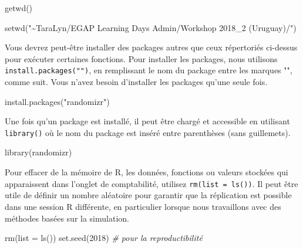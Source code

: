 \documentclass[
  12pt,
]{book}
\newenvironment{Shaded}{\begin{snugshade}}{\end{snugshade}}
\newcommand{\AttributeTok}[1]{\textcolor[rgb]{0.77,0.63,0.00}{#1}}
\newcommand{\CommentTok}[1]{\textcolor[rgb]{0.56,0.35,0.01}{\textit{#1}}}
\newcommand{\DecValTok}[1]{\textcolor[rgb]{0.00,0.00,0.81}{#1}}
\newcommand{\FunctionTok}[1]{\textcolor[rgb]{0.00,0.00,0.00}{#1}}
\newcommand{\NormalTok}[1]{#1}
\newcommand{\StringTok}[1]{\textcolor[rgb]{0.31,0.60,0.02}{#1}}
\begin{document}
\begin{Shaded}
\begin{Highlighting}[]
\FunctionTok{getwd}\NormalTok{()}
\end{Highlighting}
\end{Shaded}

\begin{Shaded}
\begin{Highlighting}[]
\FunctionTok{setwd}\NormalTok{(}\StringTok{"\textasciitilde{}TaraLyn/EGAP Learning Days Admin/Workshop 2018\_2 (Uruguay)/"}\NormalTok{)}
\end{Highlighting}
\end{Shaded}

Vous devrez peut-être installer des packages autres que ceux répertoriés ci-dessus pour exécuter certaines fonctions. Pour installer les packages, nous utilisons \texttt{install.packages("")}, en remplissant le nom du package entre les marques "", comme suit. Vous n'avez besoin d'installer les packages qu'une seule fois.

\begin{Shaded}
\begin{Highlighting}[]
\FunctionTok{install.packages}\NormalTok{(}\StringTok{"randomizr"}\NormalTok{)}
\end{Highlighting}
\end{Shaded}

Une fois qu'un package est installé, il peut être chargé et accessible en utilisant \texttt{library()} où le nom du package est inséré entre parenthèses (sans guillemets).

\begin{Shaded}
\begin{Highlighting}[]
\FunctionTok{library}\NormalTok{(randomizr)}
\end{Highlighting}
\end{Shaded}

Pour effacer de la mémoire de R, les données, fonctions ou valeurs stockées qui apparaissent dans l'onglet de comptabilité, utilisez \texttt{rm(list\ =\ ls())}. Il peut être utile de définir un nombre aléatoire pour garantir que la réplication est possible dans une session R différente, en particulier lorsque nous travaillons avec des méthodes basées sur la simulation.

\begin{Shaded}
\begin{Highlighting}[]
\FunctionTok{rm}\NormalTok{(}\AttributeTok{list =} \FunctionTok{ls}\NormalTok{())}
\FunctionTok{set.seed}\NormalTok{(}\DecValTok{2018}\NormalTok{) }\CommentTok{\# pour la reproductibilité}
\end{Highlighting}
\end{Shaded}
\end{document}
